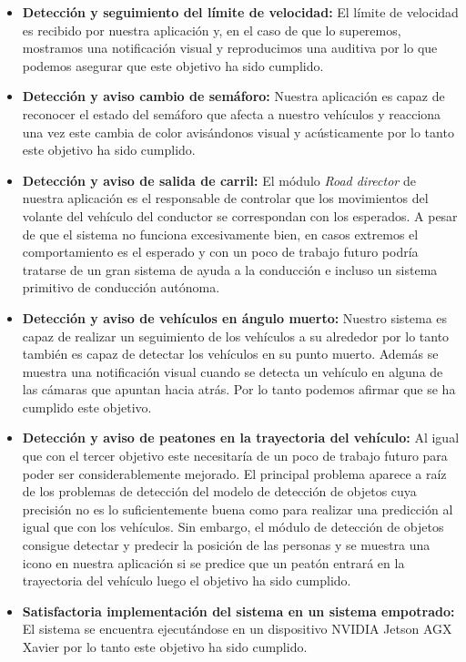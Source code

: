\begin{itemize}
    \item \textbf{Detección y seguimiento del límite de velocidad:}
                El límite de velocidad es recibido por nuestra aplicación y, en el caso de que lo superemos, mostramos una notificación visual y reproducimos una auditiva por lo que podemos asegurar que este objetivo ha sido cumplido.

    \item \textbf{Detección y aviso cambio de semáforo:}
                Nuestra aplicación es capaz de reconocer el estado del semáforo que afecta a nuestro vehículos y reacciona una vez este cambia de color avisándonos visual y acústicamente por lo tanto este objetivo ha sido cumplido.
                
    \item \textbf{Detección y aviso de salida de carril:}
                El módulo \textit{Road director} de nuestra aplicación es el responsable de controlar que los movimientos del volante del vehículo del conductor se correspondan con los esperados. A pesar de que el sistema no funciona excesivamente bien, en casos extremos el comportamiento es el esperado y con un poco de trabajo futuro podría tratarse de un gran sistema de ayuda a la conducción e incluso un sistema primitivo de conducción autónoma.

    \item \textbf{Detección y aviso de vehículos en ángulo muerto:}
                Nuestro sistema es capaz de realizar un seguimiento de los vehículos a su alrededor por lo tanto también es capaz de detectar los vehículos en su punto muerto.
                Además se muestra una notificación visual cuando se detecta un vehículo en alguna de las cámaras que apuntan hacia atrás. Por lo tanto podemos afirmar que se ha cumplido este objetivo.

    \item \textbf{Detección y aviso de peatones en la trayectoria del vehículo:}
                Al igual que con el tercer objetivo este necesitaría de un poco de trabajo futuro para poder ser considerablemente mejorado. El principal problema aparece a raíz de los problemas de detección del modelo de detección de objetos cuya precisión no es lo suficientemente buena como para realizar una predicción al igual que con los vehículos. Sin embargo, el módulo de detección de objetos consigue detectar y predecir la posición de las personas y se muestra una icono en nuestra aplicación si se predice que un peatón entrará en la trayectoria del vehículo luego el objetivo ha sido cumplido.

    \item \textbf{Satisfactoria implementación del sistema en un sistema empotrado:}
                El sistema se encuentra ejecutándose en un dispositivo NVIDIA Jetson AGX Xavier por lo tanto este objetivo ha sido cumplido.
\end{itemize}


